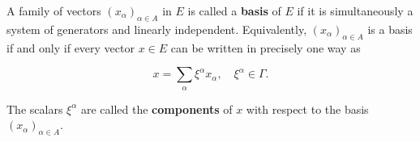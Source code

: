 A family of vectors $(x_{\alpha})_{\alpha \in A}$ in $E$ is called a \textbf{basis} of $E$ if it is simultaneously a system of generators and linearly independent. Equivalently, $(x_{\alpha})_{\alpha \in A}$ is a basis if and only if every vector $x \in E$ can be written in precisely one way as

$$x = \sum_{\alpha} \xi^{\alpha} x_{\alpha}, \quad \xi^{\alpha} \in \Gamma.$$

The scalars $\xi^{\alpha}$ are called the \textbf{components} of $x$ with respect to the basis $(x_{\alpha})_{\alpha \in A}$.
